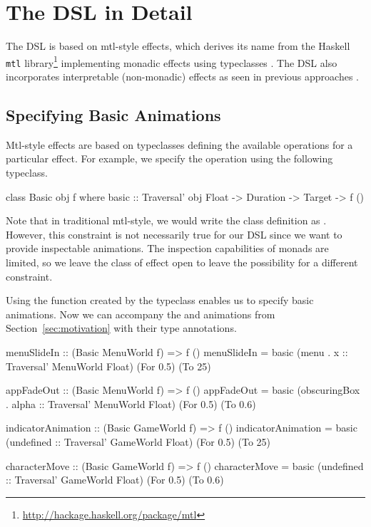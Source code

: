\section{The DSL in Detail}
\label{sec:detail}

The DSL is based on mtl-style effects, which derives its name from the Haskell \texttt{mtl} library\footnote{\url{http://hackage.haskell.org/package/mtl}} implementing monadic effects using typeclasses \cite{DBLP:conf/afp/Jones95}. The DSL also incorporates interpretable (non-monadic) effects as seen in previous approaches \cite{DBLP:journals/corr/abs-1905-06544} \cite{DBLP:conf/icfp/Lindley14}.

\subsection{Specifying Basic Animations}

Mtl-style effects are based on typeclasses defining the available operations for a particular effect. For example, we specify the  operation using the following typeclass.

\begin{code}
class Basic obj f where
  basic :: Traversal' obj Float -> Duration -> Target -> f ()
\end{code}

Note that in traditional mtl-style, we would write the class definition as . However, this constraint is not necessarily true for our DSL since we want to provide inspectable animations. The inspection capabilities of monads are limited, so we leave the class of effect open to leave the possibility for a different constraint.

Using the  function created by the  typeclass enables us to specify basic animations. Now we can accompany the  and  animations from Section~\ref{sec:motivation} with their type annotations.

\begin{code}
menuSlideIn :: (Basic MenuWorld f) => f ()
menuSlideIn = basic (menu . x :: Traversal' MenuWorld Float) (For 0.5) (To 25)

appFadeOut :: (Basic MenuWorld f) => f ()
appFadeOut = basic (obscuringBox . alpha :: Traversal' MenuWorld Float) (For 0.5) (To 0.6)
\end{code}

\begin{code}
indicatorAnimation :: (Basic GameWorld f) => f ()
indicatorAnimation = basic (undefined :: Traversal' GameWorld Float) (For 0.5) (To 25)

characterMove :: (Basic GameWorld f) => f ()
characterMove = basic (undefined :: Traversal' GameWorld Float) (For 0.5) (To 0.6)
\end{code}


